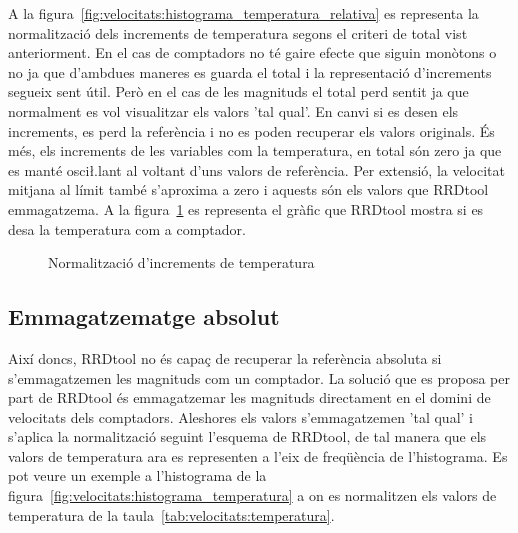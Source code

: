 A la figura~\ref{fig:velocitats:histograma_temperatura_relativa} es representa la normalització dels increments de temperatura segons el criteri de total vist anteriorment.
En el cas de comptadors no té gaire efecte que siguin monòtons o no ja que d'ambdues maneres es guarda el total i la representació d'increments segueix sent útil. Però en el cas de les magnituds el total perd sentit ja que normalment es vol visualitzar els valors 'tal qual'. En canvi si es desen els increments, es perd la referència i no es poden recuperar els valors originals. És més, els increments de les variables com la temperatura, en total són zero ja que es manté osci\l.lant al voltant d'uns valors de referència. Per extensió, la velocitat mitjana al límit també s'aproxima a zero i aquests són els valors que RRDtool emmagatzema. A la figura~\ref{fig:velocitats:temperatura_increments} es representa el gràfic que RRDtool mostra si es desa la temperatura com a comptador.


\begin{figure}[tbp]
  \centering
  \caption{Normalització d'increments de temperatura}
  \label{fig:velocitats:temperatura_increments}
\end{figure}


\subsection{Emmagatzematge absolut}

Així doncs, RRDtool no és capaç de recuperar la referència absoluta si s'emmagatzemen les magnituds com un comptador. La solució que es proposa per part de RRDtool és emmagatzemar les magnituds directament en el domini de velocitats dels comptadors. Aleshores els valors s'emmagatzemen 'tal qual' i s'aplica la normalització seguint l'esquema de RRDtool, de tal manera que els valors de temperatura ara es representen a l'eix de freqüència de l'histograma. Es pot veure un exemple a l'histograma de la figura~\ref{fig:velocitats:histograma_temperatura} a on es normalitzen els valors de temperatura de la taula~\ref{tab:velocitats:temperatura}.


